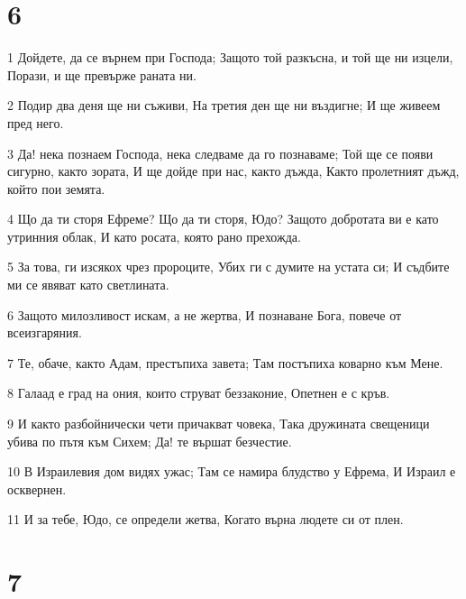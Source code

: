 \chapter{6}

\par 1 Дойдете, да се върнем при Господа; Защото той разкъсна, и той ще ни изцели, Порази, и ще превърже раната ни.
\par 2 Подир два деня ще ни съживи, На третия ден ще ни въздигне; И ще живеем пред него.
\par 3 Да! нека познаем Господа, нека следваме да го познаваме; Той ще се появи сигурно, както зората, И ще дойде при нас, както дъжда, Както пролетният дъжд, който пои земята.
\par 4 Що да ти сторя Ефреме? Що да ти сторя, Юдо? Защото добротата ви е като утринния облак, И като росата, която рано прехожда.
\par 5 За това, ги изсякох чрез пророците, Убих ги с думите на устата си; И съдбите ми се явяват като светлината.
\par 6 Защото милозливост искам, а не жертва, И познаване Бога, повече от всеизгаряния.
\par 7 Те, обаче, както Адам, престъпиха завета; Там постъпиха коварно към Мене.
\par 8 Галаад е град на ония, които струват беззаконие, Опетнен е с кръв.
\par 9 И както разбойнически чети причакват човека, Така дружината свещеници убива по пътя към Сихем; Да! те вършат безчестие.
\par 10 В Израилевия дом видях ужас; Там се намира  блудство у Ефрема, И Израил е осквернен.
\par 11 И за тебе, Юдо, се определи жетва, Когато върна людете си от плен.

\chapter{7}

